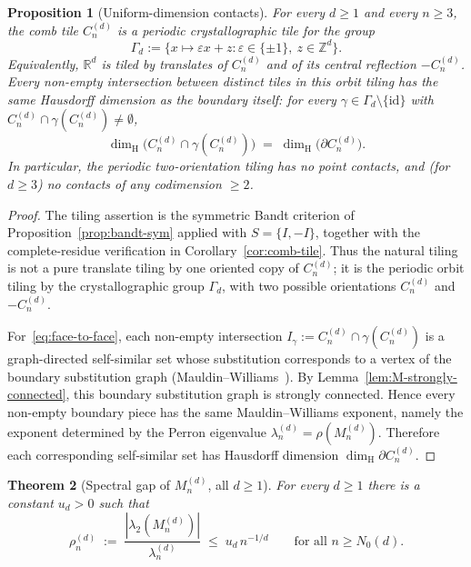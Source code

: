 \documentclass{amsart}
\newtheorem{theorem}{Theorem}[section]
\newtheorem{proposition}[theorem]{Proposition}
\theoremstyle{definition}
\theoremstyle{remark}
\newcommand{\R}{\mathbb{R}}
\newcommand{\Z}{\mathbb{Z}}
\newcommand{\dH}{\dim_{\mathrm{H}}}
\begin{document}
\begin{proposition}[Uniform-dimension contacts]
\label{prop:face-to-face}
For every $d \ge 1$ and every $n \ge 3$, the comb tile
$C_n^{(d)}$ is a periodic crystallographic tile for the group
\[
  \Gamma_d := \{x \mapsto \varepsilon x + z:
    \varepsilon \in \{\pm1\},\ z \in \Z^d\}.
\]
Equivalently, $\R^d$ is tiled by translates of $C_n^{(d)}$ and
of its central reflection $-C_n^{(d)}$.  Every non-empty
intersection between distinct tiles in this orbit tiling has the
same Hausdorff dimension as the boundary itself: for every
$\gamma \in \Gamma_d \setminus \{\mathrm{id}\}$ with
$C_n^{(d)} \cap \gamma(C_n^{(d)}) \neq \emptyset$,
\begin{equation}\label{eq:face-to-face}
  \dH\bigl(C_n^{(d)} \cap \gamma(C_n^{(d)})\bigr)
  \;=\; \dH\bigl(\partial C_n^{(d)}\bigr).
\end{equation}
In particular, the periodic two-orientation tiling has no point
contacts, and
\textup{(}for $d \ge 3$\textup{)} no contacts of any
codimension $\ge 2$.
\end{proposition}

\begin{proof}
The tiling assertion is the symmetric Bandt criterion of
Proposition~\ref{prop:bandt-sym} applied with
$S=\{I,-I\}$, together with the complete-residue verification in
Corollary~\ref{cor:comb-tile}.  Thus the natural tiling is not a
pure translate tiling by one oriented copy of $C_n^{(d)}$; it is
the periodic orbit tiling by the crystallographic group
$\Gamma_d$, with two possible orientations $C_n^{(d)}$ and
$-C_n^{(d)}$.

For~\eqref{eq:face-to-face}, each non-empty intersection
$I_\gamma := C_n^{(d)} \cap \gamma(C_n^{(d)})$ is a
graph-directed self-similar set whose substitution corresponds
to a vertex of the boundary substitution graph
(Mauldin--Williams~\cite{mauldin-williams,scheicher-thuswaldner}).
By Lemma~\ref{lem:M-strongly-connected}, this boundary substitution
graph is strongly connected.  Hence every non-empty boundary piece
has the same Mauldin--Williams exponent, namely the exponent
determined by the Perron eigenvalue $\lambda_n^{(d)}=\rho(M_n^{(d)})$.
Therefore each corresponding self-similar set has Hausdorff dimension
$\dH \partial C_n^{(d)}$.
\end{proof}

\begin{theorem}[Spectral gap of $M_n^{(d)}$, all $d \ge 1$]
\label{thm:rho-d}
For every $d \ge 1$ there is a constant $u_d > 0$ such that
\begin{equation}\label{eq:rho-d}
  \rho_n^{(d)} \;:=\;
  \frac{|\lambda_2(M_n^{(d)})|}{\lambda_n^{(d)}}
  \;\le\; u_d \, n^{-1/d}
  \qquad \text{for all } n \ge N_0(d).
\end{equation}
\end{theorem}
\end{document}
